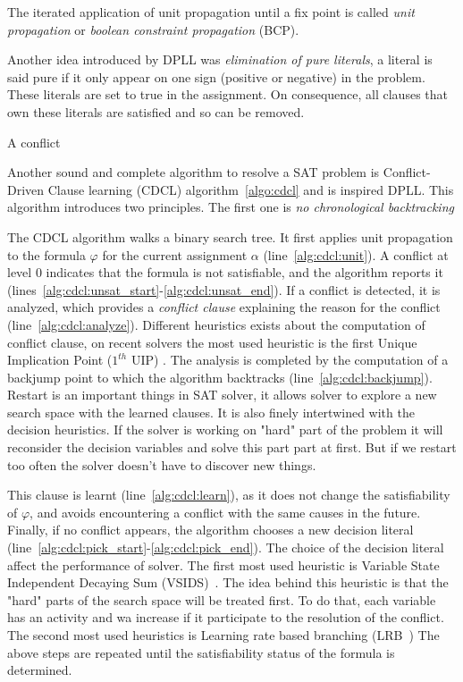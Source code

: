 The iterated application of unit propagation until a fix point is called \emph{unit propagation} or \emph{boolean constraint propagation } (BCP).

Another idea introduced by DPLL was \emph{elimination of pure literals},
a literal is said pure if it only appear on one sign (positive or negative) in the problem.
These literals are set to true in the assignment.
On consequence, all clauses that own these literals are satisfied and so can be removed.

A conflict 



Another sound and complete algorithm to resolve a SAT problem is 
Conflict-Driven Clause learning (CDCL) algorithm~\ref{algo:cdcl} and is inspired DPLL.
This algorithm introduces two principles. The first one is \emph{no chronological backtracking}



The CDCL algorithm walks a binary search tree.  It first applies unit propagation to
the formula $\varphi$ for the current assignment $\alpha$ (line~\ref{alg:cdcl:unit}).
A conflict at level $0$ indicates that the formula is not satisfiable, and the algorithm
reports it (lines~\ref{alg:cdcl:unsat_start}-\ref{alg:cdcl:unsat_end}).
If a conflict is detected, it is analyzed, which provides a \emph{conflict clause} 
explaining the reason for the conflict (line~\ref{alg:cdcl:analyze}).
Different heuristics exists about the computation of conflict clause, on recent solvers
the most used heuristic is the first Unique Implication Point ($1^{th}$ UIP) \cite{zhang2001efficient}.
The analysis is completed by the computation of a
backjump point to which the algorithm backtracks (line~\ref{alg:cdcl:backjump}).
Restart is an important things in SAT solver, it allows solver to explore a new search space
with the learned clauses. It is also finely intertwined with the decision heuristics.
If the solver is working on "hard" part of the problem it will reconsider the decision variables and
solve this part part at first. But if we restart too often the solver doesn't have to discover new things.

  This clause is learnt (line~\ref{alg:cdcl:learn}), as it does not change the
satisfiability of $\varphi$, and avoids encountering a conflict with the same
causes in the future.
Finally, if no conflict appears, the algorithm chooses a new decision literal 
(line~\ref{alg:cdcl:pick_start}-\ref{alg:cdcl:pick_end}). The choice of the decision literal
affect the performance of solver. The first most used heuristic is Variable State Independent Decaying Sum (VSIDS)~\cite{moskewicz2001chaff}. The idea behind this heuristic is that the "hard" parts of the search space 
will be treated first. To do that, each variable has an activity and wa increase if it participate to the resolution
of the conflict.
The second most used heuristics is Learning rate based branching (LRB~\cite{liang2016learning})
The above steps are repeated until the satisfiability status of the formula is determined.


